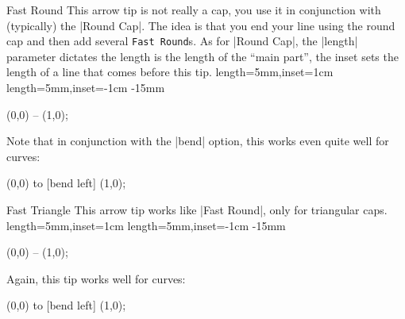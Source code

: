 \begin{arrowcap}{Fast Round}{
    This arrow tip is not really a cap, you use it in conjunction with
    (typically) the |Round Cap|. The idea is that you end your line using the
    round cap and then add several \texttt{Fast Round}s. As for |Round Cap|,
    the |length| parameter dictates the length is the length of the ``main
    part'', the inset sets the length of a line that comes before this tip.
}%
{length=5mm,inset=1cm}%
{length=5mm,inset=-1cm}%
{-15mm}

\begin{codeexample}[]
\tikz \draw [line width=1ex,
             -{Round Cap []. Fast Round[] Fast Round[]}]
  (0,0) -- (1,0);
\end{codeexample}
    Note that in conjunction with the |bend| option, this works even quite well
    for curves:
\begin{codeexample}[]
\tikz [f/.tip = Fast Round] %
  \draw [line width=1ex, -{[bend] Round Cap[] . f f f}]
  (0,0) to [bend left] (1,0);
\end{codeexample}

    \begin{arrowcapexamples}
        \arrowcapexample[]
        \arrowcapexample[reversed]
        \arrowcapexample[cap angle=60]
        \arrowcapexample[cap angle=60,inset=5pt]
        \arrowcapexample[length=.5ex]
        \arrowcapexample[slant=.3]
    \end{arrowcapexamples}
\end{arrowcap}

\begin{arrowcap}{Fast Triangle}{
    This arrow tip works like |Fast Round|, only for triangular caps.
}%
{length=5mm,inset=1cm}%
{length=5mm,inset=-1cm}%
{-15mm}

\begin{codeexample}[]
\tikz \draw [line width=1ex,
             -{Triangle Cap []. Fast Triangle[] Fast Triangle[]}]
  (0,0) -- (1,0);
\end{codeexample}
    Again, this tip works well for curves:
\begin{codeexample}[]
\tikz [f/.tip = Fast Triangle] %
  \draw [line width=1ex, -{[bend] Triangle Cap[] . f f f}]
  (0,0) to [bend left] (1,0);
\end{codeexample}

    \begin{arrowcapexamples}
        \arrowcapexample[]
        \arrowcapexample[reversed]
        \arrowcapexample[cap angle=60]
        \arrowcapexample[cap angle=60,inset=5pt]
        \arrowcapexample[length=.5ex]
        \arrowcapexample[slant=.3]
    \end{arrowcapexamples}
\end{arrowcap}


